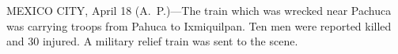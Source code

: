 
MEXICO CITY, April 18 (A.~P.)---The train which was wrecked near
Pachuca was carrying troops from Pahuca to Ixmiquilpan.  Ten men were
reported killed and 30 injured.  A military relief train was sent to
the scene.
